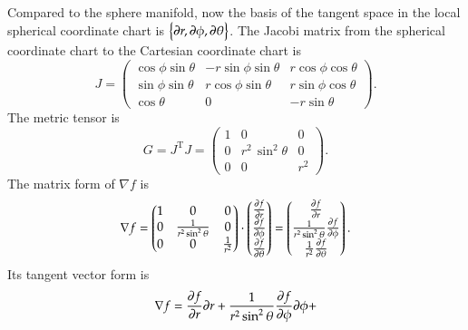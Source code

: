 \documentclass[11pt, a4paper]{book}
\begin{document}
\begin{Example}
  Compared to the sphere manifold, now the basis of the tangent space in the local
  spherical coordinate chart is
  $\left\{ \boldsymbol{\partial}r, \boldsymbol{\partial}\phi, \boldsymbol{\partial}\theta \right\}$. The Jacobi
  matrix from the spherical coordinate chart to the Cartesian coordinate chart is
  \begin{equation}
    \label{eq:ball-coordinate-jacobi}
    J = \begin{pmatrix}
      \cos\phi \sin\theta & -r\sin\phi \sin\theta & r\cos\phi \cos\theta \\
      \sin\phi \sin\theta & r\cos\phi \sin\theta & r \sin\phi \cos\theta \\
      \cos\theta & 0 & -r\sin\theta
    \end{pmatrix}.
  \end{equation}
  The metric tensor is
  \begin{equation}
    \label{eq:ball-coordinate-metric-tensor}
    G = J^{\mathrm{T}} J = \begin{pmatrix}
      1&0&0 \\
      0&r^2\,\sin ^2\theta&0 \\
      0&0&r^2
    \end{pmatrix}.
  \end{equation}
  The matrix form of $\nabla f$ is
  \begin{equation}
    \nabla f = \begin{pmatrix}
      1 & 0 & 0\\
      0 & \frac{1}{r^2\sin^2\theta} & 0 \\
      0 & 0 & \frac{1}{r^2}
    \end{pmatrix}
    \cdot
    \begin{pmatrix}
      \frac{\partial f}{\partial r} \\
      \frac{\partial f}{\partial \phi} \\
      \frac{\partial f}{\partial \theta}
    \end{pmatrix} = \begin{pmatrix}
      \frac{\partial f}{\partial r} \\
      \frac{1}{r^2\sin^2\theta} \frac{\partial f}{\partial \phi} \\
      \frac{1}{r^2} \frac{\partial f}{\partial \theta}
    \end{pmatrix}.
  \end{equation}
  Its tangent vector form is
  \begin{equation}
    \nabla f = \frac{\pdiff f}{\pdiff r}\vect{\pdiff}r + \frac{1}{r^2\sin^2\theta} \frac{\pdiff f}{\pdiff \phi} \vect{\pdiff}\phi +

\end{equation}
\end{Example}
\end{document}
